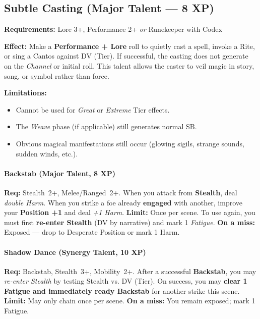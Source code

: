 \subsection*{Subtle Casting (Major Talent --- 8 XP)}

\textbf{Requirements:} Lore 3+, Performance 2+ \emph{or} Runekeeper with Codex

\textbf{Effect:} Make a \textbf{Performance + Lore} roll to quietly cast a spell, invoke a Rite, or sing a Cantos against DV (Tier). 
If successful, the casting does not generate  on the \emph{Channel} or initial roll. 
This talent allows the caster to veil magic in story, song, or symbol rather than force.

\textbf{Limitations:}
\begin{itemize}
  \item Cannot be used for \emph{Great} or \emph{Extreme} Tier effects.
  \item The \emph{Weave} phase (if applicable) still generates normal SB.
  \item Obvious magical manifestations still occur (glowing sigils, strange sounds, sudden winds, etc.).
\end{itemize}

\paragraph{Backstab (Major Talent, 8 XP)} 
\textbf{Req:} Stealth~2+, Melee/Ranged~2+.  
When you attack from \textbf{Stealth}, deal \emph{double Harm}.  
When you strike a foe already \textbf{engaged} with another, improve your \textbf{Position +1} and deal \emph{+1 Harm}.  
\textbf{Limit:} Once per scene. To use again, you must first \textbf{re-enter Stealth} (DV by narrative) and mark 1 \emph{Fatigue}.  
\textbf{On a miss:} Exposed --- drop to Desperate Position or mark 1 Harm.  

\paragraph{Shadow Dance (Synergy Talent, 10 XP)} 
\textbf{Req:} Backstab, Stealth~3+, Mobility~2+.  
After a successful \textbf{Backstab}, you may \emph{re-enter Stealth} by testing Stealth vs. DV (Tier).  
On success, you may \textbf{clear 1 Fatigue and immediately ready Backstab} for another strike this scene.  
\textbf{Limit:} May only chain once per scene.  
\textbf{On a miss:} You remain exposed; mark 1 Fatigue.  

